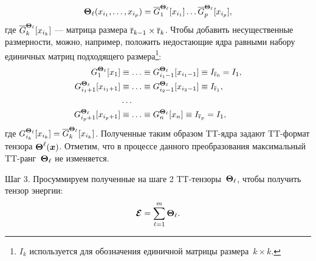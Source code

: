 \begin{equation}
\label{energy:tt-for-partial-potential}
\boldsymbol{\Theta}_\ell(x_{i_1}, \ldots, x_{i_p}) = \overline{G}^{\boldsymbol{\Theta}_\ell}_1[x_{i_1}] \ldots \overline{G}^{\boldsymbol{\Theta}_\ell}_p[x_{i_p}],
\end{equation}
где $\overline{G}^{\boldsymbol{\Theta}_\ell}_k[x_{i_k}]$ --- матрица размера $\overline{\operatorname{r}}_{k-1} \times \overline{\operatorname{r}}_k$. Чтобы добавить несущественные размерности, можно, например, положить недостающие ядра равными набору единичных матриц подходящего размера\footnote{$I_k$ используется для обозначения единичной матрицы размера~$k \times k$.}:
\begin{equation*}
\begin{aligned}
G^{\boldsymbol{\Theta}_\ell}_1[x_1] &\equiv  \ldots \equiv G^{\boldsymbol{\Theta}_\ell}_{i_1 - 1}[x_{i_1 - 1}] \equiv I_{\overline{\operatorname{r}}_0} = I_1,\\
G^{\boldsymbol{\Theta}_\ell}_{i_1 + 1}[x_{i_1 + 1}] &\equiv \ldots \equiv G^{\boldsymbol{\Theta}_\ell}_{i_2 - 1}[x_{i_2 - 1}] \equiv I_{\overline{\operatorname{r}}_1},\\
&\ldots\\
G^{\boldsymbol{\Theta}_\ell}_{i_p + 1}[x_{i_p + 1}] &\equiv \ldots \equiv G^{\boldsymbol{\Theta}_\ell}_{n}[x_{n}] \equiv I_{\overline{\operatorname{r}}_p} = I_1,
\end{aligned}
\end{equation*}
где $G^{\boldsymbol{\Theta}_\ell}_{i_k}[x_{i_k}] = \overline{G}^{\boldsymbol{\Theta}_\ell}_{k}[x_{i_k}]$. Полученные таким образом TT\hyp{}ядра задают TT\hyp{}формат тензора $\boldsymbol{\Theta}^\ell(\boldsymbol{x})$.
Отметим, что в процессе данного преобразования максимальный TT\hyp{}ранг~$\boldsymbol{\Theta}_\ell$ не изменяется.

Шаг 3. Просуммируем полученные на шаге 2 TT\hyp{}тензоры~$\boldsymbol{\Theta}_\ell$, чтобы получить тензор энергии:
\begin{equation}
\label{energy:energy-tensor-as-sum-of-potential-tensors}
\boldsymbol{\mathcal{E}} = \sum_{\ell=1}^m \boldsymbol{\Theta}_\ell.
\end{equation}

